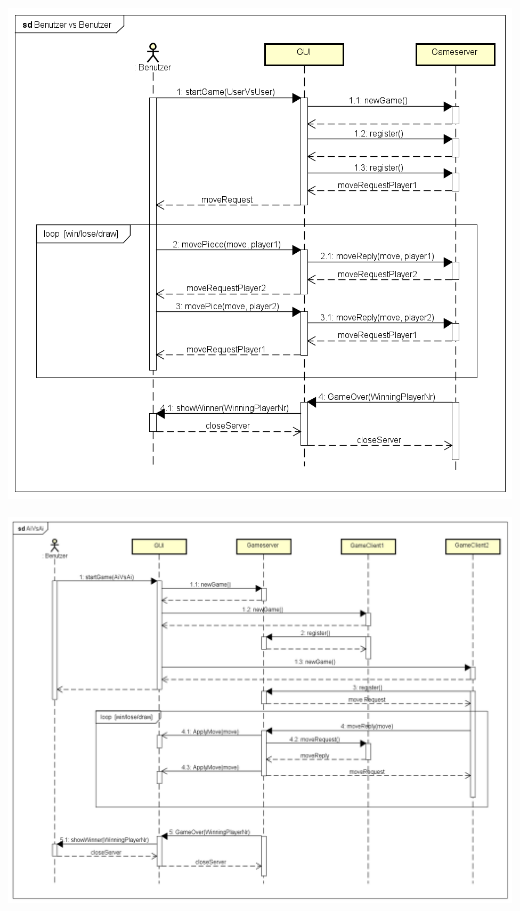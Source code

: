 \documentclass[12pt,a4paper,bibliography=totocnumbered,listof=totocnumbered]{article}
\begin{document}
\begin{appendix}
\vspace{1em}
\begin{minipage}{\linewidth}
	\centering
	\includegraphics[width=1.0\linewidth]{pics/SequenceDiagramBenutzervsBenutzer.png}
    \label{fig:UserVsAI}
\end{minipage}

\vspace{1em}
\begin{minipage}{\linewidth}
	\centering
	\includegraphics[width=1.0\linewidth]{pics/SequenceDiagramAiVsAi.png}
    \label{fig:AiVsAi}
\end{minipage}





\end{appendix}
\end{document}
